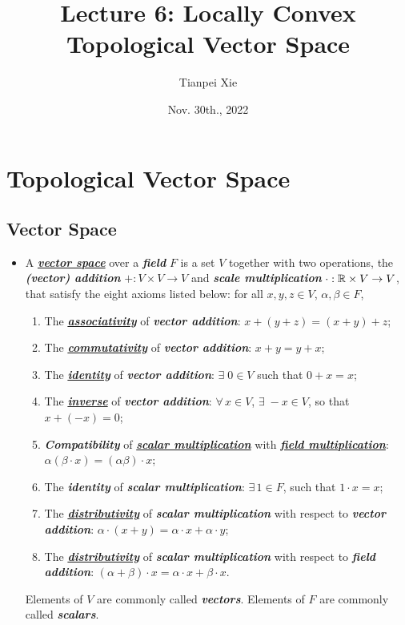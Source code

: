 \documentclass[11pt]{article}
\begin{document}
\title{Lecture 6: Locally Convex Topological Vector Space}
\author{ Tianpei Xie}
\date{ Nov. 30th., 2022 }
\maketitle
\tableofcontents
\newpage

\section{Topological Vector Space}
\subsection{Vector Space}
\begin{itemize}
\item \begin{definition}
 A \underline{\emph{\textbf{vector space}}} over a \emph{\textbf{field}} $F$ is a set $V$ together with two operations,  the \emph{\textbf{(vector) addition}} $+: V\times V \rightarrow V$ and \emph{\textbf{scale multiplication}} $\cdot: {\mathbb R}\times V \rightarrow V$, that satisfy the eight axioms listed below:
for all $x, y, z\in V$, $\alpha, \beta\in F$, 
\begin{enumerate}
\item The \underline{\emph{\textbf{associativity}}} of \emph{\textbf{vector addition}}: $x+ (y+ z) = (x+ y)+ z$;
\item The \underline{\emph{\textbf{commutativity}}} of \emph{\textbf{vector addition}}:  $x + y = y+ x$;
\item The \underline{\emph{\textbf{identity}}} of \emph{\textbf{vector addition}}: $\exists\; 0\in V$	 such that $0+ x = x$;
\item The \underline{\emph{\textbf{inverse}}} of \emph{\textbf{vector addition}}: $\forall\, x\in V$, $\exists\;-x\in V$, so that $x+ (- x) = 0$;
\item \emph{\textbf{Compatibility}} of \underline{\emph{\textbf{scalar multiplication}}} with \underline{\emph{\textbf{field multiplication}}}: $\alpha(\beta \cdot x) = (\alpha\beta)\cdot x$;
\item The \emph{\textbf{identity}} of \emph{\textbf{scalar multiplication}}: $\exists\, 1\in F$, such that $1\cdot x = x$;
\item The \underline{\emph{\textbf{distributivity}}} of \emph{\textbf{scalar multiplication}} with respect to \emph{\textbf{vector addition}}: $\alpha\cdot (x+y)= \alpha\cdot x+ \alpha\cdot y$;
\item The \underline{\emph{\textbf{distributivity}}} of \emph{\textbf{scalar multiplication}} with respect to \emph{\textbf{field addition}}: $(\alpha+ \beta)\cdot x = \alpha\cdot x+ \beta\cdot x $.	
\end{enumerate}
Elements of $V$ are commonly called \emph{\textbf{vectors}}. Elements of $F$ are commonly called \emph{\textbf{scalars}}.
\end{definition}


\end{itemize}
\end{document}

